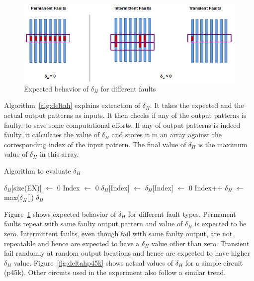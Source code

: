 \begin{figure}[h]
  \begin{center}
    \captionsetup{justification=centering}
    \includegraphics[scale=0.65]{figures/deltah.png}
    \caption{Expected behavior of $\delta_H$ for different faults}
    \label{fig:deltah}
  \end{center}
\end{figure}

Algorithm~\ref{alg:deltah} explains extraction of $\delta_H$. It takes the expected and the actual output patterns as inputs. It then checks if any of the output patterns is faulty, to save some computational efforts. If any of output patterns is indeed faulty, it calculates the value of $\delta_H$ and stores it in an array against the corresponding index of the input pattern. The final value of $\delta_H$ is the maximum value of $\delta_H$ in this array. 

\begin{algorithm}[H]
  \caption{Algorithm to evaluate $\delta_H$}
  \label{alg:deltah}
  \begin{algorithmic}
 \State $\delta_H$[size(EX)] $\leftarrow$ 0\;
 \State Index $\leftarrow$ 0\;
   \State $\delta_H$[Index] $\leftarrow$ \;
  \Else
   \State $\delta_H$[Index] $\leftarrow$ 0\;
  \EndIf
  \State Index++\;
 \EndWhile
 \State$\delta_H$ $\leftarrow$ max($\delta_H$[])\;
 \State \Return $\delta_H$\;
 \EndProcedure
 \end{algorithmic}
\end{algorithm}

Figure~\ref{fig:deltah} shows expected behavior of $\delta_H$ for different fault types. Permanent faults repeat with same faulty output pattern and value of $\delta_H$ is expected to be zero. Intermittent faults, even though fail with same faulty output, are not repeatable and hence are expected to have a $\delta_H$ value other than zero. Transient fail randomly at random output locations and hence are expected to have higher $\delta_H$ value. Figure~\ref{fig:deltahp45k} shows actual values of $\delta_H$ for a simple circuit (p45k).  Other circuits used in the experiment also follow a similar trend.


